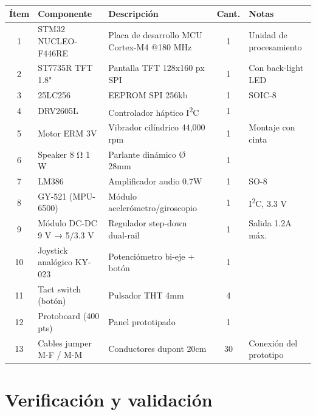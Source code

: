 \documentclass[11pt,a4paper]{article}
\begin{document}
\begin{longtable}{|c|p{4cm}|p{4.5cm}|c|p{3cm}|}
\hline
\rowcolor[HTML]{C0C0C0}
\textbf{Ítem} & \textbf{Componente} & \textbf{Descripción} & \textbf{Cant.} & \textbf{Notas} \\
\hline
1  & STM32 NUCLEO-F446RE             & Placa de desarrollo MCU Cortex-M4 @180 MHz         & 1 & Unidad de procesamiento \\ \hline
2  & ST7735R TFT 1.8"     & Pantalla TFT 128x160 px SPI                         & 1 & Con back-light LED \\ \hline
3  & 25LC256                         & EEPROM SPI 256kb                     & 1 & SOIC-8 \\ \hline
4  & DRV2605L                        & Controlador háptico I\textsuperscript{2}C           & 1 &  \\ \hline
5  & Motor ERM {3}{\si\volt}         & Vibrador cilíndrico {44,000} rpm               & 1 & Montaje con cinta \\ \hline
6  & Speaker 8 Ω 1 W                 & Parlante dinámico Ø {28}{\si\mm}          & 1 &  \\ \hline %
7  & LM386                            & Amplificador audio {0.7}{\si\watt}                 & 1 & SO-8 \\ \hline
8  & GY-521 (MPU-6500)               & Módulo acelerómetro/giroscopio                     & 1 & I\textsuperscript{2}C, 3.3 V \\ \hline
9  & Módulo DC-DC 9 V → 5/3.3 V      & Regulador step-down dual-rail                      & 1 & Salida {1.2}{\si\ampere} máx. \\ \hline
10 & Joystick analógico KY-023       & Potenciómetro bi-eje + botón                       & 1 & \\ \hline
11 & Tact switch (botón)             & Pulsador THT {4}{\si\mm}                  & 4 &  \\ \hline
12 & Protoboard (400 pts)            & Panel prototipado                          & 1 &  \\ \hline
13 & Cables jumper M-F / M-M         & Conductores dupont {20}{\si\cm}           & 30 & Conexión del prototipo \\ \hline
\end{longtable}

\section{Verificación y validación}
\end{document}
